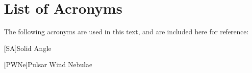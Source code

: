 
\chapter*{List of Acronyms}


The following acronyms are used in this text, and
are included here for reference:
\begin{acronym}
[SA]{Solid Angle}

[PWNe]{Pulsar Wind Nebulae}



\end{acronym}

